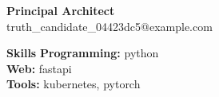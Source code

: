 \documentclass[10pt]{article}
\begin{document}
\begin{center}
    {\LARGE \textbf{Principal Architect}} \\
    truth\_candidate\_04423dc5@example.com
\end{center}

\textbf{Skills}
\textbf{Programming:} python\\
\textbf{Web:} fastapi\\
\textbf{Tools:} kubernetes, pytorch\\
\end{document}
